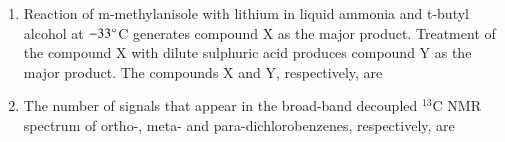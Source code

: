 \documentclass[journal,12pt,onecolumn]{IEEEtran}
\theoremstyle{remark}
\begin{document}
\begin{enumerate}[resume]
\item Reaction 
 of m-methylanisole with lithium in liquid ammonia and t-butyl alcohol at $-33\degree$C generates compound X as the major product.
 Treatment of the compound X with dilute sulphuric acid produces compound Y as the major product.
 The compounds X and Y, respectively, are
\begin{enumerate}
\end{enumerate}
\hfill{}



\item The number of signals that appear in the broad-band decoupled $^{13}$C NMR spectrum of ortho-, meta- and para-dichlorobenzenes, respectively, are
    \begin{enumerate}
        \hfill{}
    \end{enumerate}




\end{enumerate}
\end{document}
